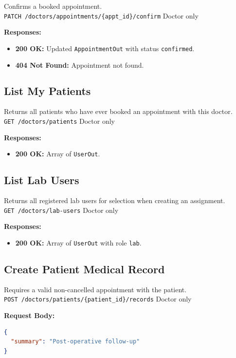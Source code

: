 \documentclass[a4paper,12pt]{report}
\begin{document}
Confirms a booked appointment. \\
\texttt{PATCH /doctors/appointments/\{appt\_id\}/confirm} \hfill Doctor only

\noindent\textbf{Responses:}
\begin{itemize}
    \item \textbf{200 OK:} Updated \texttt{AppointmentOut} with status \texttt{confirmed}.
    \item \textbf{404 Not Found:} Appointment not found.
\end{itemize}

\subsection{List My Patients}

Returns all patients who have ever booked an appointment with this doctor. \\
\texttt{GET /doctors/patients} \hfill Doctor only

\noindent\textbf{Responses:}
\begin{itemize}
    \item \textbf{200 OK:} Array of \texttt{UserOut}.
\end{itemize}

\subsection{List Lab Users}

Returns all registered lab users for selection when creating an assignment. \\
\texttt{GET /doctors/lab-users} \hfill Doctor only

\noindent\textbf{Responses:}
\begin{itemize}
    \item \textbf{200 OK:} Array of \texttt{UserOut} with role \texttt{lab}.
\end{itemize}

\subsection{Create Patient Medical Record}

Requires a valid non-cancelled appointment with the patient. \\
\texttt{POST /doctors/patients/\{patient\_id\}/records} \hfill Doctor only

\noindent\textbf{Request Body:}
\begin{lstlisting}[language=json]
{
  "summary": "Post-operative follow-up"
}
\end{lstlisting}
\end{document}

